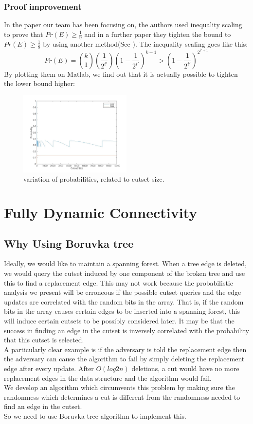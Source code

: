 \documentclass[conference,compsoc]{IEEEtran}
\begin{document}
\subsubsection*{Proof improvement} In the paper our team has been focusing on, the authors used inequality scaling to prove that $Pr(E) \ge \frac{1}{9}$ and in a further paper they tighten the bound to $Pr(E) \ge \frac{1}{8}$ by using another method(See \cite{article}). The inequality scaling goes like this:
$$Pr(E)={k \choose 1}(\frac{1}{2^{i'}})(1-\frac{1}{2^{i'}})^{k-1} > (1-\frac{1}{2^{i'}})^{2^{i'+1}}$$
By plotting them on Matlab, we find out that it is actually possible to tighten the lower bound higher:
\begin{figure}[H]
	\centering
	\includegraphics[width=0.5\textwidth]{Pic/fig.jpg}
	\caption{ variation of probabilities, related to cutset size.}
	\label{fig:7}
\end{figure}


\section{Fully Dynamic Connectivity}
\subsection{Why Using Boruvka tree}
Ideally, we would like to maintain a spanning forest. When a tree edge is deleted, we would query the cutset induced by one component of the broken tree and use this to find a replacement edge. This may not work because the probabilistic analysis we present will be erroneous if the possible cutset queries and the edge updates are correlated with the random bits in the array. That is, if the random bits in the array
causes certain edges to be inserted into a spanning forest, this will induce certain cutsets to be possibly considered later. It may be that the success in finding an edge in the cutset is inversely correlated with the probability that this cutset is selected.\\ A particularly
clear example is if the adversary is told the replacement edge then the adversary can cause the algorithm to fail by simply deleting the replacement edge after every update. After $O(log2 n)$ deletions, a cut would have no more replacement edges in the data structure and the
algorithm would fail.\\
We develop an algorithm which circumvents this
problem by making sure the randomness which determines
a cut is different from the randomness needed to
find an edge in the cutset.\\
So we need to use Boruvka tree algorithm to implement this.
\end{document}

